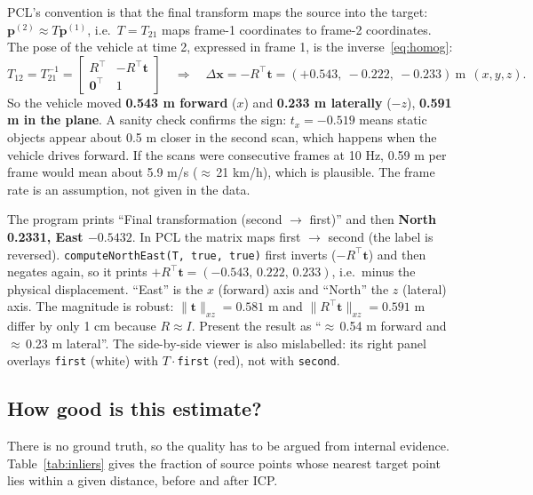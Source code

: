 \documentclass[10pt,a4paper]{scrartcl}
\renewcommand{\emph}[1]{\textcolor{accent}{#1}}
\newcommand{\code}[1]{\texttt{#1}}
\begin{document}
  PCL's convention is that the final transform maps the \emph{source} into the
  \emph{target}: $\bm p^{(2)}\approx T\bm p^{(1)}$, i.e.\ $T=T_{21}$ maps
  frame-1 coordinates to frame-2 coordinates. The pose of the vehicle at time 2,
  expressed in frame 1, is the inverse~\eqref{eq:homog}:
  \begin{equation}
    T_{12}=T_{21}^{-1}=\begin{bmatrix}R^\top & -R^\top\bm t\\ \bm 0^\top&1\end{bmatrix}
    \quad\Longrightarrow\quad
    \Delta\bm x=-R^\top\bm t=(+0.543,\ -0.222,\ -0.233)\ \text{m}\ \ (x,y,z).
  \end{equation}
  So the vehicle moved \textbf{0.543 m forward} ($x$) and \textbf{0.233 m laterally}
  ($-z$), \textbf{0.591 m in the plane}. A sanity check confirms the sign:
  $t_x=-0.519$ means static objects appear about 0.5 m \emph{closer} in the second scan,
  which happens when the vehicle drives forward. If the scans were consecutive frames at
  10 Hz, 0.59 m per frame would mean about 5.9 m/s ($\approx$\,21 km/h), which is
  plausible. The frame rate is an assumption, not given in the data.

  \begin{warnbox}
  \small
  The program prints ``Final transformation (second $\to$ first)'' and then
  \textbf{North 0.2331, East $-0.5432$}. In PCL the matrix maps \emph{first $\to$
  second} (the label is reversed). \code{computeNorthEast(T, true, true)} first inverts
  ($-R^\top\bm t$) and then negates again, so it prints $+R^\top\bm t=(-0.543,\,0.222,\,0.233)$,
  i.e.\ \emph{minus} the physical displacement. ``East'' is the $x$ (forward) axis and
  ``North'' the $z$ (lateral) axis. The \emph{magnitude} is robust: $\|\bm t\|_{xz}=0.581$ m
  and $\|R^\top\bm t\|_{xz}=0.591$ m differ by only 1 cm because $R\approx I$.
  Present the result as ``$\approx$\,0.54 m forward and $\approx$\,0.23 m lateral''. The
  side-by-side viewer is also mislabelled: its right panel overlays \code{first}
  (white) with $T\cdot$\code{first} (red), not with \code{second}.
  \end{warnbox}

  \subsection{How good is this estimate?}

  There is no ground truth, so the quality has to be argued from internal
  evidence. Table~\ref{tab:inliers} gives the fraction of source points whose nearest
  target point lies within a given distance, before and after ICP.
\end{document}

